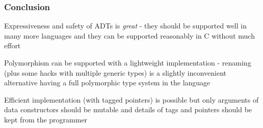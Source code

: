 \documentclass[t,t]{beamer}
\begin{document}
\begin{frame}
\frametitle{Conclusion}
Expressiveness and safety of ADTs is \emph{great} - they should be
supported well in many more languages and they can be supported
reasonably in C without much effort

Polymorphism can be supported with a lightweight implementation - renaming
(plus some hacks with multiple generic types) is a slightly inconvenient
alternative having a full polymorphic type system in the language

Efficient implementation (with tagged pointers) is possible but only
arguments of data constructors should be mutable and details
of tags and pointers should be kept from the programmer
\end{frame}
\end{document}
